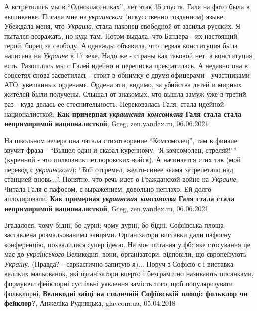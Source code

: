А встретились мы в \enquote{Одноклассниках}, лет этак 35 спустя. Галя на фото была в
вышиванке. Писала мне на \emph{украинском} (искусственно созданном) языке. Убеждала
меня, что \emph{Украина}, стала наконец свободной от засилья русских. Я пытался
возражать, но куда там. Потом выдала, что Бандера - их настоящий герой, борец
за свободу. А однажды объявила, что первая конституция была написана на \emph{Украине}
в 17 веке. Надо же - страны как таковой нет, а конституция есть. Разошлись мы с
Галей идейно и переписка прекратилась. А недавно она в соцсетях снова
засветилась - стоит в обнимку с двумя офицерами - участниками АТО, увешанных
орденами. Ордена эти, видимо, за убийства детей и мирных жителей были получены.
Слышал от знакомых, что вышла замуж уже в третий раз - куда делась ее
стеснительность. Перековалась Галя, стала идейной националисткой,
\textbf{Как примерная \emph{украинская комсомолка} Галя стала стала непримиримой националисткой},
Greg, zen.yandex.ru, 06.06.2021

На школьном вечера она читала стихотворение \enquote{Комсомолец}, там в финале
звучит фраза - \enquote{Вышел один и сказал куренному: \enquote{Я комсомолец,
стреляй!}} (куренной - это полковник петлюровских войск). А начинается стих так
(мой перевод с \emph{украинского}): \enquote{Бой отгремел, желто-синее знамя
затрепетало над станцией вновь...}. Понятно, что речь идет о Гражданской войне
на \emph{Украине}. Читала Галя с пафосом, с выражением, довольно неплохо. Ей долго
аплодировали,
\textbf{Как примерная \emph{украинская комсомолка} Галя стала стала непримиримой националисткой},
Greg, zen.yandex.ru, 06.06.2021

Згадалося: чому бідні, бо дурні; чому дурні, бо бідні. Софіївська площа
заставлена розмальованими зайцями. Організатори виставки дали пафосну
конференцію, похвалилися супер ідеєю. На моє питання у фб: яке стосування це
має до \emph{українського} Великодня, вони, організатори, відповіли, що
європеїзують \emph{Україну}. (Правда? - саркастично запитую я)...  Поруч з
Софією є і виставка великих мальованок, які організатори вперто і безграмотно
називають писанками, формуючи фейклорні суспільні уявлення замість того, щоб
популяризувати фольклорні, 
\textbf{Великодні зайці на столичній Софіївській площі: фольклор чи фейклор?},
Анжеліка Рудницька, glavcom.ua, 05.04.2018


